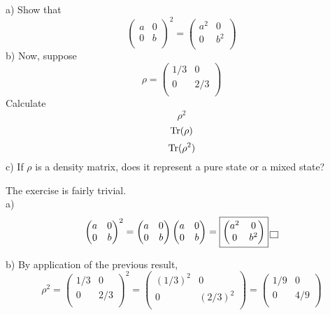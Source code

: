 \documentclass[solutions.tex]{subfiles}
\begin{document}
\maketitle
\begin{exercise} a) Show that
\[
	\begin{pmatrix}
		a & 0 \\
		0 & b \\
	\end{pmatrix}^2 = \begin{pmatrix}
		a^2 & 0 \\
		0 & b^2 \\
	\end{pmatrix}
\]
b) Now, suppose
\[
	\rho = \begin{pmatrix}
		1/3 & 0        \\
		0        & 2/3 \\
	\end{pmatrix}
\]
Calculate
\[ \rho^2 \]
\[ \Tr(\rho) \]
\[ \Tr(\rho^2) \]
c) If $\rho$ is a density matrix, does it represent a pure state or
a mixed state?
\end{exercise}
The exercise is fairly trivial. \\

a) \[
	\begin{pmatrix}
		a & 0 \\
		0 & b \\
	\end{pmatrix}^2 =
	\begin{pmatrix}
		a & 0 \\
		0 & b \\
	\end{pmatrix}
	\begin{pmatrix}
		a & 0 \\
		0 & b \\
	\end{pmatrix} = \boxed{\begin{pmatrix}
		a^2 & 0 \\
		0 & b^2 \\
	\end{pmatrix}} \qed
\]

b) By application of the previous result,
\[
	\rho^2 = \begin{pmatrix}
		1/3 & 0        \\
		0        & 2/3 \\
	\end{pmatrix}^2 = \begin{pmatrix}
		(1/3)^2 & 0 \\
		0 & (2/3)^2 \\
	\end{pmatrix}= \boxed{\begin{pmatrix}
		1/9 & 0 \\
		0 & 4/9 \\
	\end{pmatrix}}
\]
\end{document}
